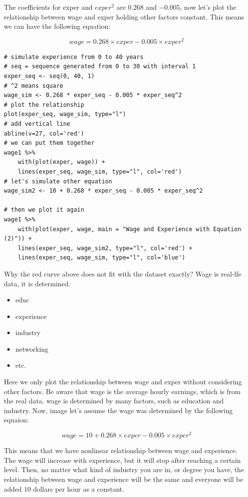 \documentclass[11pt]{article}
\theoremstyle{definition}
\providecommand{\tightlist}{%
\setlength{\itemsep}{0pt}\setlength{\parskip}{0pt}}
\begin{document}
The coefficients for exper and $exper^2$ are  $0.268$ and  $−0.005$, 
now let's plot the relationship between wage and exper holding 
other factors constant. This means we can have the following equation:


\begin{equation}
wage = 0.268 \times exper - 0.005 \times exper^2 \tag{wage-equation (1)}
\end{equation}

\begin{lstlisting}
# simulate experience from 0 to 40 years
# seq = sequence generated from 0 to 30 with interval 1
exper_seq <- seq(0, 40, 1)
# ^2 means square
wage_sim <- 0.268 * exper_seq - 0.005 * exper_seq^2
# plot the relationship
plot(exper_seq, wage_sim, type="l")
# add vertical line
abline(v=27, col='red')
# we can put them together
wage1 %>%
    with(plot(exper, wage)) +
    lines(exper_seq, wage_sim, type="l", col='red')
# let's simulate other equation
wage_sim2 <- 10 + 0.268 * exper_seq - 0.005 * exper_seq^2

# then we plot it again 
wage1 %>%
    with(plot(exper, wage, main = "Wage and Experience with Equation (2)")) +
    lines(exper_seq, wage_sim2, type="l", col='red') + 
    lines(exper_seq, wage_sim, type="l", col='blue') 
\end{lstlisting}

Why the red curve above does not fit with the dataset exactly? Wage 
is real-lfe data, it is determined:

\begin{itemize}
  \tightlist
  \item educ
  \item experience
  \item industry
  \item networking
  \item etc.
\end{itemize}


Here we only plot the relationship between wage and exper without 
considering other factors. Be aware that wage is the average 
hourly earnings, which is from the real data. wage is determined 
by many factors, such as education and industry. 
Now, image let's assume the wage was determined by the following equaion:


\begin{equation}
wage = 10+  0.268 \times exper - 0.005 \times exper^2 \tag{wage-equation (2)}
\end{equation}

This means that we have nonlinear relationship between
wage and experience. The wage will increase with experience, but it will 
stop after reaching a certain level. Then, no matter what kind of industry you are in,
or degree you have, the relationship between wage and experience will be the 
same and everyone will be added $10$ dollars per hour as a constant.
\end{document}
